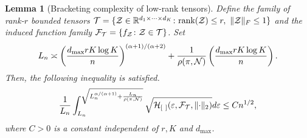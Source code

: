 \documentclass[11pt]{article}
\theoremstyle{plain}
\newtheorem{lem}{Lemma}
\theoremstyle{definition}
\def\rank{\textup{rank}}
\begin{document}
\begin{lem}[Bracketing complexity of low-rank tensors] \label{lem:metric}
Define the family of rank-$r$ bounded tensors $\tT=\{\tZ\in\mathbb{R}^{d_1\times \cdots \times d_K}\colon \rank(\tZ)\leq r, \ \FnormSize{}{\tZ}\leq 1\}$ and the induced function family $\mathcal{F}_{\mathcal{T}} = \{f_{\mathcal{Z}}\colon \mathcal{Z}\in\mathcal{T}\}$.  Set 
\begin{equation}\label{eq:specification}
L_n\asymp \left({d_{\max}rK\log K \over n } \right)^{(\alpha+1)/(\alpha+2)} + {1\over \rho (\pi, \mathcal{N})}\left({d_{\max}rK\log K \over n } \right).
\end{equation}
Then, the following inequality is satisfied.
\begin{equation}\label{eq:L}
{1\over L_n}\int^{\sqrt{L_n^{\alpha/(\alpha+1)}+{L_n\over \rho (\pi, \mathcal{N})}}}_{L_n} \sqrt{\mathcal{H}_{[\ ]}(\varepsilon, \mathcal{F}_{\mathcal{T}} ,\lVert\cdot\rVert_2) }d\varepsilon \leq Cn^{1/2},
\end{equation}
where $C>0$ is a constant independent of $r,K$  and $d_{\text{max}}$.
\end{lem}
\end{document}
